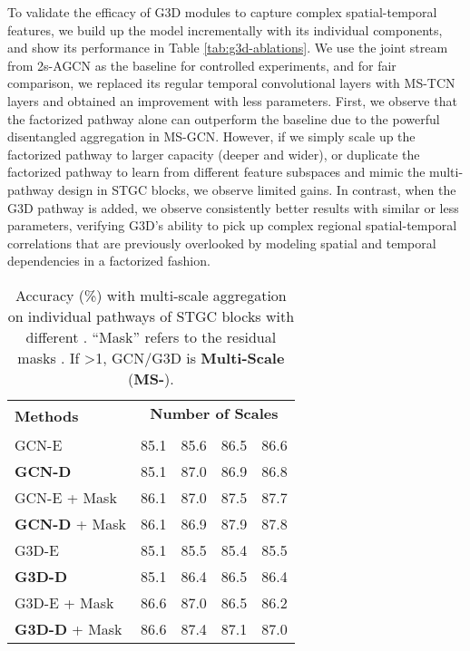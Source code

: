 \documentclass[10pt,twocolumn,letterpaper]{article}
\begin{document}
To validate the efficacy of G3D modules to capture complex spatial-temporal features, we build up the model incrementally with its individual components, and show its performance in Table \ref{tab:g3d-ablations}.
We use the joint stream from 2s-AGCN \cite{2s-AGCN} as the baseline for controlled experiments, and for fair comparison, we replaced its regular temporal convolutional layers with MS-TCN layers and obtained an improvement with less parameters.
First, we observe that the factorized pathway alone can outperform the baseline due to the powerful disentangled aggregation in MS-GCN.
However, if we simply scale up the factorized pathway to larger capacity (deeper and wider), or duplicate the factorized pathway to learn from different feature subspaces and mimic the multi-pathway design in STGC blocks, we observe limited gains.
In contrast, when the G3D pathway is added, we observe consistently better results with similar or less parameters, verifying G3D's ability to pick up complex regional spatial-temporal correlations that are previously overlooked by modeling spatial and temporal dependencies in a factorized fashion.









\begin{table}[t]
\centering
\begin{tabular}{lcccc}
\hline
\multirow{2}{*}{\textbf{Methods}} & \multicolumn{4}{c}{\textbf{Number of Scales}} \\
& \small  & \small  & \small  & \small  \\ \hline \hline
GCN-E & 85.1 & 85.6 & 86.5 & 86.6 \\
\textbf{GCN-D} & 85.1 & 87.0 & 86.9 & 86.8 \\ \hline
GCN-E + Mask & 86.1 & 87.0 & 87.5 & 87.7 \\
\textbf{GCN-D} + Mask & 86.1 & 86.9 & 87.9 & 87.8 \\ \hline \hline
G3D-E & 85.1 & 85.5 & 85.4 & 85.5 \\
\textbf{G3D-D} & 85.1 & 86.4 & 86.5 & 86.4 \\ \hline
G3D-E + Mask & 86.6 & 87.0 & 86.5 & 86.2 \\
\textbf{G3D-D} + Mask & 86.6 & 87.4 & 87.1 & 87.0 \\ \hline
\end{tabular}
\caption{
Accuracy (\%) with multi-scale aggregation on individual pathways of STGC blocks with different .
``Mask'' refers to the residual masks .
If \textgreater 1, GCN/G3D is \textbf{Multi-Scale} (\textbf{MS-}).
}
\label{tab:ablation-disentangled}
\vspace{-0mm}\end{table}
\end{document}
